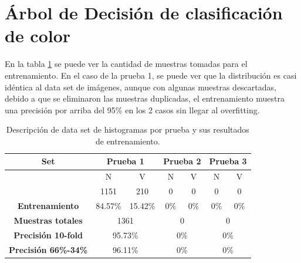 \documentclass[twoside,spanish,ESP,MSc]{plantillaLabUPV}
\theoremstyle{definition}
\begin{document}
\section{Árbol de Decisión de clasificación de color}

En la tabla \ref{imadatcol} se puede ver la cantidad de muestras tomadas para el entrenamiento. En el caso de la prueba 1, se puede ver que la distribución es casi idéntica al data set de imágenes, aunque con algunas muestras descartadas, debido a que se eliminaron las muestras duplicadas, el entrenamiento muestra una precisión por arriba del 95\% en los 2 casos sin llegar al overfitting.

\begin{table}[h]
	\caption{Descripción de data set de histogramas por prueba y sus resultados de entrenamiento.}
	\label{imadatcol}
	\centering
	\begin{tabular}{|c|c|c|c|c|c|c|}
		\hline
		\textbf{Set}                             & \multicolumn{2}{c|}{\textbf{Prueba 1}}              & \multicolumn{2}{c|}{\textbf{Prueba 2}}              & \multicolumn{2}{c|}{\textbf{Prueba 3}}              \\ \hline
		& {\color[HTML]{F56B00} N} & {\color[HTML]{009901} V} & {\color[HTML]{F56B00} N} & {\color[HTML]{009901} V} & {\color[HTML]{F56B00} N} & {\color[HTML]{009901} V} \\ \cline{2-7} 
		& 1151                     & 210                      & 0                        & 0                        & 0                        & 0                        \\ \cline{2-7} 
		\multirow{-3}{*}{\textbf{Entrenamiento}} & 84.57\%                  & 15.42\%                  & 0\%                      & 0\%                      & 0\%                      & 0\%                      \\ \hline
		\textbf{Muestras totales}                & \multicolumn{2}{c|}{1361}                           & \multicolumn{2}{c|}{0}                              & \multicolumn{2}{c|}{0}                              \\ \hline
		\textbf{Precisión 10-fold}               & \multicolumn{2}{c|}{95.73\%}                        & \multicolumn{2}{c|}{0\%}                            & \multicolumn{2}{c|}{0\%}                            \\ \hline
		\textbf{Precisión 66\%-34\%}             & \multicolumn{2}{c|}{96.11\%}                        & \multicolumn{2}{c|}{0\%}                            & \multicolumn{2}{c|}{0\%}                            \\ \hline
	\end{tabular}
\end{table}
\end{document}
